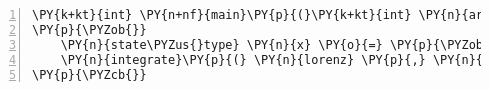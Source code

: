 \begin{Verbatim}[commandchars=\\\{\},numbers=left,firstnumber=1,stepnumber=1]
\PY{k+kt}{int} \PY{n+nf}{main}\PY{p}{(}\PY{k+kt}{int} \PY{n}{argc}\PY{p}{,} \PY{k+kt}{char} \PY{o}{*}\PY{o}{*}\PY{n}{argv}\PY{p}{)}
\PY{p}{\PYZob{}}
    \PY{n}{state\PYZus{}type} \PY{n}{x} \PY{o}{=} \PY{p}{\PYZob{}} \PY{l+m+mf}{10.0} \PY{p}{,} \PY{l+m+mf}{1.0} \PY{p}{,} \PY{l+m+mf}{1.0} \PY{p}{\PYZcb{}}\PY{p}{;} \PY{c+c1}{// initial conditions}
    \PY{n}{integrate}\PY{p}{(} \PY{n}{lorenz} \PY{p}{,} \PY{n}{x} \PY{p}{,} \PY{l+m+mf}{0.0} \PY{p}{,} \PY{l+m+mf}{25.0} \PY{p}{,} \PY{l+m+mf}{0.1} \PY{p}{,} \PY{n}{write\PYZus{}lorenz} \PY{p}{)}\PY{p}{;}
\PY{p}{\PYZcb{}}
\end{Verbatim}
